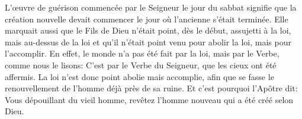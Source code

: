 L’œuvre de guérison commencée par le Seigneur le jour du sabbat
	signifie que la création nouvelle devait commencer
	le jour où l’ancienne s’était terminée.
Elle marquait aussi que le Fils de Dieu n’était point, dès le début,
	assujetti à la loi, mais au-dessus de la loi
	et qu’il n’était point venu pour abolir la loi, mais pour l’accomplir.
En effet, le monde n’a pas été fait par la loi, mais par le Verbe,
	comme nous le lisons:
	C’est par le Verbe du Seigneur, que les cieux ont été affermis.
La loi n’est donc point abolie mais accomplie,
	afin que se fasse le renouvellement de l’homme déjà près de sa ruine.
Et c’est pourquoi l’Apôtre dit:
	Vous dépouillant du vieil homme, revêtez l’homme nouveau
		qui a été créé selon Dieu.
